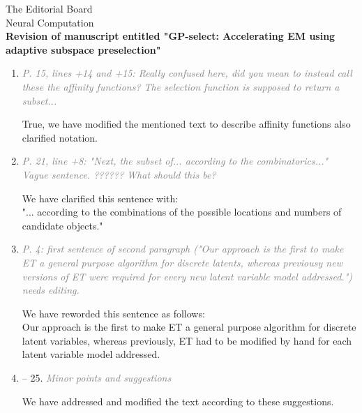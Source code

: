 \documentclass[10pt]{letter}
\newcommand{\rvr}[1]{\textcolor{gray}{#1}}
\newcommand{\pr}{\mathrm{pr}}%
\begin{document}
\begin{letter}{
The Editorial Board\\
Neural Computation\\
\vspace{10mm}
\textbf{Revision of manuscript entitled "GP-select: Accelerating EM using adaptive
subspace preselection"}
}
\begin{enumerate}[topsep=3pt,itemsep=2ex,partopsep=1ex,parsep=1ex]
    Model \textbf{C}. \textit{Nonlinear Spike-and-slab sparse coding}:
    \begin{align}
&\hat{W}_{hd}   = \frac{\langle s_h y_d \rangle^*}{\langle s_d^2 \rangle^*}\ 
\text{\quad}
&\hat{\sigma}^2 = \left\langle W_{dh} s_h - y_d^{(n)}\right\rangle^\ast \nonumber\\
%
&\hat{\pi} = \langle \delta(s) \rangle  \text{\quad}\text{\quad}\text{\quad}\nonumber\\
%
&\hat{\mu}_{\pr} = \langle s_h \rangle^* 
 \text{\quad}\text{\quad}\text{\quad}\text{\quad}\text{\quad}\text{\quad}\text{\quad} 
&\hat{\sigma}^2_{\pr} = \langle (s_h - \hat{\mu}_{\pr})^2 \rangle^* \nonumber
%
\end{align}


    \item \rvr{\emph{P. 15, lines +14 and +15: Really confused here, did you mean to instead call these the affinity functions? The selection function is supposed to return a subset...}}

    True, we have modified the mentioned text to describe affinity functions also clarified notation. 


    \item \rvr{\emph{P. 21, line +8: "Next, the subset of... according to the combinatorics..." Vague sentence. ??????  What should this be?}}

We have clarified this sentence with:\\
"... according to the combinations of the possible locations and numbers of candidate objects."

    
    \item \rvr{\emph{ P. 4: first sentence of second paragraph ("Our approach is the first to make ET a general purpose algorithm for discrete latents, whereas previousy new versions of ET were required for every new latent variable model addressed.") needs editing.}}

We have reworded this sentence as follows:\\
Our approach is the first to make ET a general purpose algorithm for discrete latent variables, 
 whereas previously, ET had to be modified by hand for each latent variable model addressed. 

    \item -- 25. \rvr{\emph{Minor points and suggestions}}

        We have addressed and modified the text according to these suggestions. 



\end{enumerate}
\end{letter}
\end{document}
